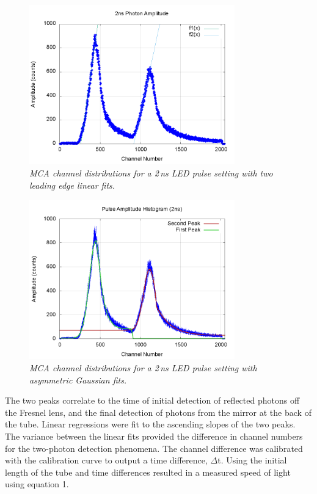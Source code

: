 \documentclass[aps,prl,twocolumn,superscriptaddress,nofootinbib]{revtex4-1}
\begin{document}
\begin{figure}[h!]
  \begin{center}
\centerline{\includegraphics[width=3.5in]{solgraph2.png}}
\caption{\it \small{MCA channel distributions for a 2\,ns LED pulse setting with two leading edge linear fits. \label{fig1}}}
  \end{center}
\end{figure}

\begin{figure}[h!]
  \begin{center}
\centerline{\includegraphics[width=3.5in]{2nsgauss.png}}
\caption{\it \small{MCA channel distributions for a 2\,ns LED pulse setting with asymmetric Gaussian fits. \label{fig1}}}
  \end{center}
\end{figure}


The two peaks correlate to the time of initial detection of reflected photons off the Fresnel lens, and the final detection of photons from the mirror at the back of the tube. Linear regressions were fit to the ascending slopes of the two peaks. The variance between the linear fits provided the difference in channel numbers for the two-photon detection phenomena. The channel difference was calibrated with the calibration curve to output a time difference, $\Delta$t. Using the initial length of the tube and time differences resulted in a measured speed of light using equation 1.
\end{document}
